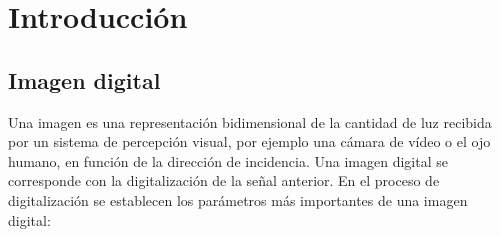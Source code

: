 \documentclass[es,practica]{uah}
\begin{document}

\maketitle

\section{Introducción}

\subsection{Imagen digital}

Una imagen es una representación bidimensional de la cantidad de luz recibida por un sistema de percepción visual, por ejemplo una cámara de vídeo o el ojo humano, en función de la dirección de incidencia. Una imagen digital se corresponde con la digitalización de la señal anterior. En el proceso de digitalización se establecen los parámetros más importantes de una imagen digital:
\end{document}
